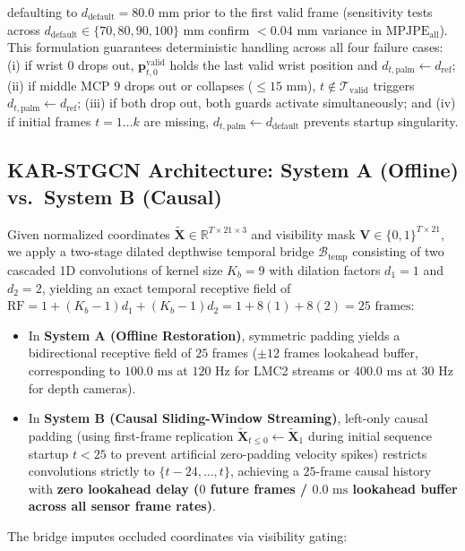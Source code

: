 \documentclass[10pt,twocolumn]{article}
\begin{document}
defaulting to $d_{\text{default}} = 80.0\text{ mm}$ prior to the first valid frame (sensitivity tests across $d_{\text{default}} \in \{70, 80, 90, 100\}\text{ mm}$ confirm $<0.04\text{ mm}$ variance in $\text{MPJPE}_{\text{all}}$). This formulation guarantees deterministic handling across all four failure cases: (i) if wrist $0$ drops out, $\mathbf{p}_{t,0}^{\text{valid}}$ holds the last valid wrist position and $d_{t,\text{palm}} \leftarrow d_{\text{ref}}$; (ii) if middle MCP $9$ drops out or collapses ($\le 15\text{ mm}$), $t \notin \mathcal{T}_{\text{valid}}$ triggers $d_{t,\text{palm}} \leftarrow d_{\text{ref}}$; (iii) if both drop out, both guards activate simultaneously; and (iv) if initial frames $t=1\dots k$ are missing, $d_{t,\text{palm}} \leftarrow d_{\text{default}}$ prevents startup singularity.

\subsection{KAR-STGCN Architecture: System A (Offline) vs.\ System B (Causal)}
Given normalized coordinates $\tilde{\mathbf{X}} \in \mathbb{R}^{T \times 21 \times 3}$ and visibility mask $\mathbf{V} \in \{0,1\}^{T \times 21}$, we apply a two-stage dilated depthwise temporal bridge $\mathcal{B}_{\text{temp}}$ consisting of two cascaded 1D convolutions of kernel size $K_b=9$ with dilation factors $d_1=1$ and $d_2=2$, yielding an exact temporal receptive field of $\text{RF} = 1 + (K_b-1)d_1 + (K_b-1)d_2 = 1 + 8(1) + 8(2) = 25\text{ frames}$:
\begin{itemize}
    \item In \textbf{System A (Offline Restoration)}, symmetric padding yields a bidirectional receptive field of $25$ frames ($\pm 12$ frames lookahead buffer, corresponding to $100.0\text{ ms}$ at $120\text{ Hz}$ for LMC2 streams or $400.0\text{ ms}$ at $30\text{ Hz}$ for depth cameras).
    \item In \textbf{System B (Causal Sliding-Window Streaming)}, left-only causal padding (using first-frame replication $\tilde{\mathbf{X}}_{t \le 0} \leftarrow \tilde{\mathbf{X}}_1$ during initial sequence startup $t < 25$ to prevent artificial zero-padding velocity spikes) restricts convolutions strictly to $\{t-24, \dots, t\}$, achieving a $25$-frame causal history with \textbf{zero lookahead delay ($0$ future frames / $0.0\text{ ms}$ lookahead buffer across all sensor frame rates)}.
\end{itemize}
The bridge imputes occluded coordinates via visibility gating:
\end{document}
